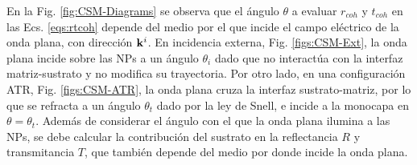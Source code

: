 En la Fig. \ref{fig:CSM-Diagrams}	 se observa que el ángulo $\theta$ a evaluar $r_{coh}$ y $t_{coh}$ en las Ecs. \eqref{eqs:rtcoh} depende del medio por el que incide el campo eléctrico de la onda plana, con dirección $\vb{k}^i$. En incidencia externa, Fig. \ref{figs:CSM-Ext}, la onda plana incide sobre las NPs a un ángulo $\theta_i$ dado que no interactúa con la interfaz matriz-sustrato y no modifica su trayectoria. Por otro lado, en una configuración ATR, Fig. \ref{figs:CSM-ATR}, la onda plana cruza la interfaz sustrato-matriz, por lo que se refracta a un ángulo $\theta_t$ dado por la ley de Snell, e incide a la monocapa en $\theta=\theta_t$. Además de considerar el ángulo con el que la onda plana ilumina a las NPs, se debe calcular la contribución del sustrato en la reflectancia $R$ y transmitancia $T$, que también depende del medio por donde incide la onda plana.

